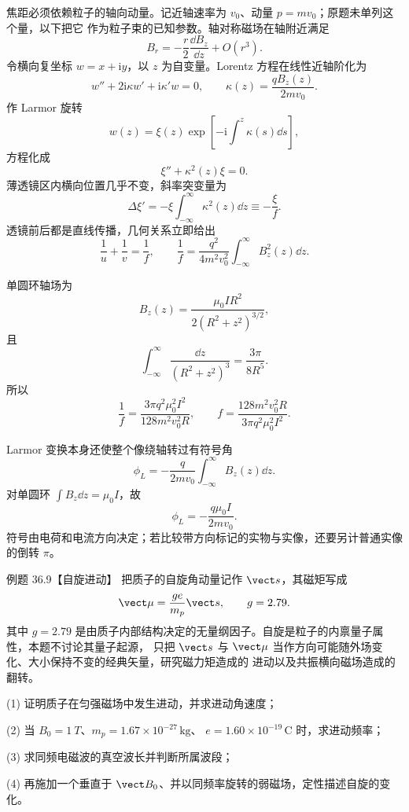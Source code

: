\begin{xesolution}
焦距必须依赖粒子的轴向动量。记近轴速率为 $v_0$、动量 $p=mv_0$；原题未单列这个量，以下把它
作为粒子束的已知参数。轴对称磁场在轴附近满足
\begin{equation}
  B_r=-\frac r2\frac{\dd B_z}{\dd z}+O(r^3).
\end{equation}
令横向复坐标 $w=x+\mathrm i y$，以 $z$ 为自变量。Lorentz 方程在线性近轴阶化为
\begin{equation}
  w''+2\mathrm i\kappa w'+\mathrm i\kappa'w=0,
  \qquad
  \kappa(z)=\frac{qB_z(z)}{2mv_0}.
\end{equation}
作 Larmor 旋转
\[
  w(z)=\xi(z)\exp\!\left[-\mathrm i\int^z\kappa(s)\dd s\right],
\]
方程化成
\begin{equation}
  \xi''+\kappa^2(z)\xi=0.
\end{equation}
薄透镜区内横向位置几乎不变，斜率突变量为
\[
  \Delta\xi'=-\xi\int_{-\infty}^{\infty}\kappa^2(z)\dd z
  \equiv-\frac{\xi}{f}.
\]
透镜前后都是直线传播，几何关系立即给出
\begin{equation}
  \boxed{\frac1u+\frac1v=\frac1f},
  \qquad
  \boxed{\frac1f=\frac{q^2}{4m^2v_0^2}
  \int_{-\infty}^{\infty}B_z^2(z)\dd z}.
\end{equation}

单圆环轴场为
\[
  B_z(z)=\frac{\mu_0IR^2}{2(R^2+z^2)^{3/2}},
\]
且
\[
  \int_{-\infty}^{\infty}\frac{\dd z}{(R^2+z^2)^3}
  =\frac{3\pi}{8R^5}.
\]
所以
\begin{equation}
  \boxed{\frac1f=\frac{3\pi q^2\mu_0^2I^2}{128m^2v_0^2R}},
  \qquad
  \boxed{f=\frac{128m^2v_0^2R}{3\pi q^2\mu_0^2I^2}}.
\end{equation}

Larmor 变换本身还使整个像绕轴转过有符号角
\begin{equation}
  \phi_L=-\frac{q}{2mv_0}\int_{-\infty}^{\infty}B_z(z)\dd z.
\end{equation}
对单圆环 $\int B_z\dd z=\mu_0I$，故
\begin{equation}
  \boxed{\phi_L=-\frac{q\mu_0I}{2mv_0}}.
\end{equation}
符号由电荷和电流方向决定；若比较带方向标记的实物与实像，还要另计普通实像的倒转 $\pi$。

\magneticLensDiagram
\end{xesolution}

\Needspace{0.34\textheight}
\begin{origexamplebox}{例题 36.9【自旋进动】}
把质子的自旋角动量记作 $\vect s$，其磁矩写成
\[
  \vect\mu=\frac{ge}{m_p}\vect s,
  \qquad g=2.79.
\]
其中 $g=2.79$ 是由质子内部结构决定的无量纲因子。自旋是粒子的内禀量子属性，本题不讨论其量子起源，
只把 $\vect s$ 与 $\vect\mu$ 当作方向可能随外场变化、大小保持不变的经典矢量，研究磁力矩造成的
进动以及共振横向磁场造成的翻转。

(1) 证明质子在匀强磁场中发生进动，并求进动角速度；

(2) 当 $B_0=\SI{1}{T}$、$m_p=1.67\times10^{-27}\,\mathrm{kg}$、
$e=1.60\times10^{-19}\,\mathrm C$ 时，求进动频率；

(3) 求同频电磁波的真空波长并判断所属波段；

(4) 再施加一个垂直于 $\vect B_0$、并以同频率旋转的弱磁场，定性描述自旋的变化。
\end{origexamplebox}

